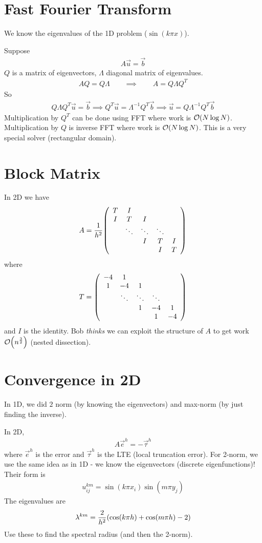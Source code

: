 \documentclass{article}
\newcommand{\tridsym}[3]{
    \qty(\begin{array}{ccccc}
                    #1 & #2 & & & \\
                    #3 & #1 & #2 & & \\
                    & \ddots & \ddots & \ddots &  \\
                    & & #3 & #1 & #2 \\
                    & & & #3 & #1
                \end{array})
}
\begin{document}
    \section{Fast Fourier Transform}
        We know the eigenvalues of the 1D problem ($\sin(k\pi x)$).

        Suppose 
        \begin{align}
            A\vec{u} = \vec{b}
        \end{align}\tabularnewline
        $Q$ is a matrix of eigenvectors, $\Lambda$ diagonal matrix of eigenvalues.
        \begin{align}
            AQ = Q\Lambda \qquad \implies \qquad A = Q\Lambda Q^T
        \end{align}
        So
        \begin{align}
            Q\Lambda Q^T\vec{u} = \vec{b} \implies
            Q^T\vec{u} = \Lambda^{-1}Q^T\vec{b} \implies
            \vec{u} = Q\Lambda^{-1}Q^T\vec{b}
        \end{align}
        Multiplication by $Q^T$ can be done using FFT where work is $\order{N\log{N}}$.  Multiplication by $Q$ is inverse FFT where work is $\order{N\log{N}}$.  This is a very special solver (rectangular domain).

    \section{Block Matrix}
        In 2D we have
        \begin{align}
            A = \frac{1}{h^2}\tridsym{T}{I}{I}
        \end{align}
        where
        \begin{align}
            T = \tridsym{-4}{1}{1}
        \end{align}
        and $I$ is the identity.  Bob \emph{thinks} we can exploit the structure of $A$ to get work $\order{n^{\frac{3}{2}}}$ (nested dissection).

    \section{Convergence in 2D}
        In 1D, we did $2$ norm (by knowing the eigenvectors) and max-norm (by just finding the inverse).

        In 2D,
        \begin{align}
            A\vec{e}^h = -\vec{\tau}^h
        \end{align}
        where $\vec{e}^h$ is the error and $\vec{\tau}^h$ is the LTE (local truncation error).  For 2-norm, we use the same idea as in 1D - we know the eigenvectors (discrete eigenfunctions)!  Their form is
        \begin{align}
            u_{ij}^{km} = \sin(k\pi x_i)\sin(m\pi y_j)
        \end{align}
        The eigenvalues are
        \begin{align}
            \lambda^{km} = \frac{2}{h^2}\qty(\cos(k\pi h) + \cos(m\pi h) - 2)
        \end{align}
        Use these to find the spectral radius (and then the 2-norm).
\end{document}
